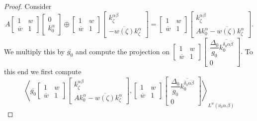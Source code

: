 \documentclass[10pt,a4paper]{amsart}
\def\D{\Delta}
\def\a{\alpha}
\def\b{\beta}
\def\d{\delta}
\begin{document}
\begin{proof}
Consider
$$
A
\begin{bmatrix}
1 & w \\
\overline{w} & 1
\end{bmatrix}
\begin{bmatrix}
0
\\
k^\a_0
\end{bmatrix}
\oplus
\left[\begin{array}{cc} 1& w \\
\overline{w} & 1\end{array}\right]\left[\begin{array}{c} k^{\alpha\beta}_\zeta \\
-\overline{w(\zeta)} k^\alpha_\zeta \end{array}\right]
=
\left[\begin{array}{cc} 1& w \\
\overline{w} & 1\end{array}\right]\left[\begin{array}{c} k^{\alpha\beta}_\zeta \\
A k^\a_0-\overline{w(\zeta)} k^\alpha_\zeta \end{array}\right].
$$
We multiply this by $\overline{g_0}$ and compute the projection on
$\begin{bmatrix}
1 & w \\
\overline{w} & 1
\end{bmatrix}
\begin{bmatrix}
\dfrac{\D_0}{g_0}\overline{k^{\d_0\overline{\alpha\b}}_0}
\\
0
\end{bmatrix}.$
To this end we first compute
$$
\left\langle
\overline{g_0}
\left[\begin{array}{cc} 1& w \\
\overline{w} & 1\end{array}\right]\left[\begin{array}{c} k^{\alpha\beta}_\zeta \\
A k^\a_0-\overline{w(\zeta)} k^\alpha_\zeta \end{array}\right]
,
\begin{bmatrix}
1 & w \\
\overline{w} & 1
\end{bmatrix}
\begin{bmatrix}
\dfrac{\D_0}{g_0}\overline{k^{\d_0\overline{\alpha\b}}_0}
\\
0
\end{bmatrix}
\right\rangle_{L^w(\overline{\nu_0}\a.\b)}
$$
\end{proof}
\end{document}
